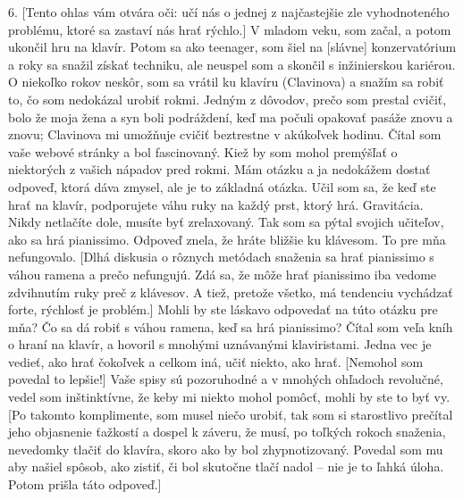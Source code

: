 6. [Tento ohlas vám otvára oči: učí nás o jednej z najčastejšie zle vyhodnoteného problému, ktoré sa zastaví nás hrať rýchlo.]
V mladom veku, som začal, a potom ukončil hru na klavír. Potom sa ako teenager, som šiel na [slávne] konzervatórium a roky sa snažil získať techniku, ale neuspel som a skončil s inžinierskou kariérou. O niekoľko rokov neskôr, som sa vrátil ku klavíru (Clavinova) a snažím sa robiť to, čo som nedokázal urobiť rokmi. Jedným z dôvodov, prečo som prestal cvičiť, bolo že moja žena a syn boli podráždení, keď ma počuli opakovať pasáže znovu a znovu; Clavinova mi umožňuje cvičiť beztrestne v akúkoľvek hodinu. Čítal som vaše webové stránky a bol fascinovaný. Kiež by som mohol premýšľať o niektorých z vašich nápadov pred rokmi. Mám otázku a ja nedokážem dostať odpoveď, ktorá dáva zmysel, ale je to základná otázka. Učil som sa, že keď ste hrať na klavír, podporujete váhu ruky na každý prst, ktorý hrá. Gravitácia. Nikdy netlačíte dole, musíte byť zrelaxovaný. Tak som sa pýtal svojich učiteľov, ako sa hrá pianissimo. Odpoveď znela, že hráte bližšie ku klávesom. To pre mňa nefungovalo. [Dlhá diskusia o rôznych metódach snaženia sa hrať pianissimo s váhou ramena a prečo nefungujú. Zdá sa, že môže hrať pianissimo iba vedome zdvihnutím ruky preč z klávesov. A tiež, pretože všetko, má tendenciu vychádzať forte, rýchlosť je problém.] Mohli by ste láskavo odpovedať na túto otázku pre mňa? Čo sa dá robiť s váhou ramena, keď sa hrá pianissimo? Čítal som veľa kníh o hraní na klavír, a hovoril s mnohými uznávanými klaviristami. Jedna vec je vedieť, ako hrať čokoľvek a celkom iná, učiť niekto, ako hrať. [Nemohol som povedal to lepšie!] Vaše spisy sú pozoruhodné a v mnohých ohľadoch revolučné, vedel som inštinktívne, že keby mi niekto mohol pomôcť,  mohli by ste to byť vy. 
[Po takomto komplimente, som musel niečo urobiť, tak som si starostlivo prečítal jeho objasnenie ťažkostí a dospel k záveru, že musí, po toľkých rokoch snaženia, nevedomky tlačiť do klavíra, skoro ako by bol zhypnotizovaný. Povedal som mu aby našiel spôsob, ako zistiť, či bol skutočne tlačí nadol – nie je to ľahká úloha. Potom prišla táto odpoveď.]
